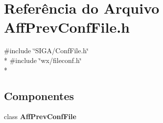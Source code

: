 \section{Referência do Arquivo Aff\+Prev\+Conf\+File.\+h}
\label{_aff_prev_conf_file_8h}
{\ttfamily \#include \char`\"{}S\+I\+G\+A/\+Conf\+File.\+h\char`\"{}}\\*
{\ttfamily \#include \char`\"{}wx/fileconf.\+h\char`\"{}}\\*
\subsection*{Componentes}
\begin{DoxyCompactItemize}
\item 
class {\bf Aff\+Prev\+Conf\+File}
\end{DoxyCompactItemize}
